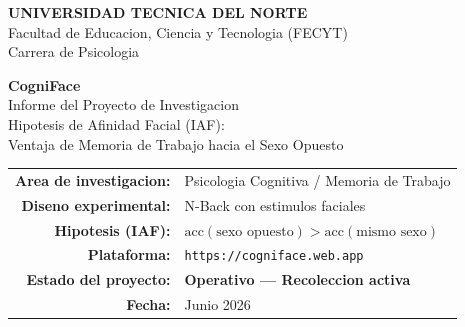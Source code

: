 \documentclass[12pt,a4paper]{article}
\begin{document}
\begin{titlepage}

\vspace*{2.5cm}
\begin{center}
  {\LARGE\bfseries\textcolor{primary}{UNIVERSIDAD TECNICA DEL NORTE}}\\[0.4cm]
  {\large Facultad de Educacion, Ciencia y Tecnologia (FECYT)}\\[0.2cm]
  {\large Carrera de Psicologia}\\[2cm]

  \begin{tcolorbox}[infobox, width=0.92\textwidth]
    \centering
    {\Huge\bfseries\textcolor{primary}{CogniFace}}\\[0.5cm]
    {\LARGE Informe del Proyecto de Investigacion}\\[0.3cm]
    {\large Hipotesis de Afinidad Facial (IAF):\\
    Ventaja de Memoria de Trabajo hacia el Sexo Opuesto}
  \end{tcolorbox}

  \vspace{1.5cm}
  \begin{tabular}{rl}
    \textbf{Area de investigacion:}  & Psicologia Cognitiva / Memoria de Trabajo \\[0.3cm]
    \textbf{Diseno experimental:}    & N-Back con estimulos faciales \\[0.3cm]
    \textbf{Hipotesis (IAF):}        &
      $\text{acc}(\text{sexo opuesto}) > \text{acc}(\text{mismo sexo})$ \\[0.3cm]
    \textbf{Plataforma:}             & \texttt{https://cogniface.web.app} \\[0.3cm]
    \textbf{Estado del proyecto:}    &
      \textcolor{success}{\textbf{Operativo --- Recoleccion activa}} \\[0.3cm]
    \textbf{Fecha:}                  & Junio 2026
  \end{tabular}
\end{center}
\end{titlepage}

\tableofcontents
\newpage

\end{document}
